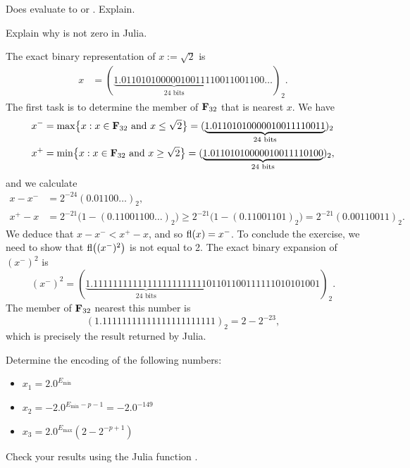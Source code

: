 \begin{exercise}
    Does  evaluate to  or .
    Explain.
\end{exercise}

\begin{exercise}
    Explain why  is not zero in Julia.
\end{exercise}
\begin{solution}
    The exact binary representation of $x := \sqrt{2}$ is
    \begin{align*}
        x
        &= (\underbrace{1.01101010000010011110011}_{\text{24 bits}}001100\dots)_2.
    \end{align*}
    The first task is to determine the member of $\mathbf F_{32}$ that is nearest $x$.
    We have
    \begin{align*}
        x^- &= \max \bigl\{x: x \in \mathbf F_{32} \text{ and } x \leq \sqrt{2}\bigr\} = (\underbrace{1.01101010000010011110011}_{\text{24 bits}})_2 \\
        x^+ &= \min \bigl\{x: x \in \mathbf F_{32} \text{ and } x \geq \sqrt{2}\bigr\} = (\underbrace{1.01101010000010011110100}_{\text{24 bits}})_2,
    \end{align*}
    and we calculate
    \begin{align*}
        x - x^- &= 2^{-24} (0.01100\dots)_2, \\
        x^+ - x &= 2^{-21} \bigl(1 - (0.11001100\dots)_2 \bigr)
        \geq 2^{-21} \bigl(1 - (0.11001101)_2 \bigr) =
        2^{-21} \left(0.00110011\right)_2.
    \end{align*}
    We deduce that $x - x^- < x^+ - x$,
    and so ${\rm fl}(x) = x^-$.
    To conclude the exercise,
    we need to show that ${\rm fl}\bigl((x^-)^2\bigr)$ is not equal to 2.
    The exact binary expansion of $(x^-)^2$ is
    \[
        (x^-)^2 = (\underbrace{1.11111111111111111111111}_{\text{24 bits}}01101100111111010101001)_2.
    \]
    The member of $\mathbf F_{32}$ nearest this number is
    \[
        (1.11111111111111111111111)_2 = 2 - 2^{-23},
    \]
    which is precisely the result returned by Julia.
\end{solution}

\begin{exercise}
    Determine the encoding of the following  numbers:
    \begin{itemize}
        \item $x_1 = 2.0^{E_{\min}}$
        \item $x_2 = - 2.0^{E_{\min} - p - 1} = - 2.0^{-149}$
        \item $x_3 =2.0^{E_{\max}} (2-2^{-p+1})$
    \end{itemize}
    Check your results using the Julia function .
\end{exercise}

